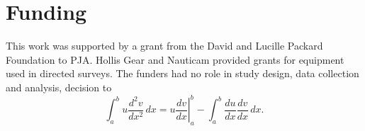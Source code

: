 \section{Funding}
\label{funding} 
This work was supported by a grant from the David and Lucille Packard Foundation to PJA. Hollis Gear and Nauticam provided grants for equipment used in directed surveys. The funders had no role in study design, data collection and analysis, decision to 
\begin{equation}
\label{eqn:drag}
	\int_a^bu\frac{d^2v}{dx^2}\,dx
	=\left.u\frac{dv}{dx}\right|_a^b
	-\int_a^b\frac{du}{dx}\frac{dv}{dx}\,dx.
\end{equation}

